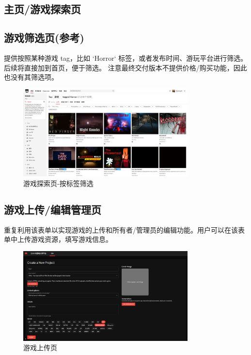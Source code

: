 \documentclass[12pt]{ctexart} %
\begin{document}
\subsection{主页/游戏探索页}


\subsection{游戏筛选页(参考)}

提供按照某种游戏 tag，比如 `Horror` 标签，或者发布时间、游玩平台进行筛选。后续将直接加到首页，便于筛选。
注意最终交付版本不提供价格/购买功能，因此也没有其筛选项。

\begin{figure}[H]
  \centering
  \includegraphics[width=0.8\textwidth]{UI-tagged.png}
  \caption{游戏探索页-按标签筛选}
\end{figure}

\subsection{游戏上传/编辑管理页}

重复利用该表单以实现游戏的上传和所有者/管理员的编辑功能。用户可以在该表单中上传游戏资源，填写游戏信息。

\begin{figure}[H]
  \centering
  \includegraphics[width=0.8\textwidth]{UI-upload.png}
  \caption{游戏上传页}
\end{figure}
\end{document}
